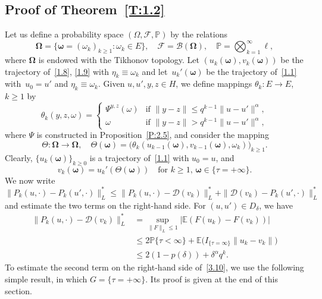 \documentclass[JEP,XML,SOM,Unicode,ThmDefs]{cedram}
\let\mathcal\mathscr
\theoremstyle{plain}
\numberwithin{equation}{section}
\newcommand{\IP}{{\mathbb P}}
\newcommand{\E}{{\mathbb E}}
\newcommand{\OOmega}{{\boldsymbol\Omega}}
\newcommand{\oomega}{{\boldsymbol\omega}}
\newcommand{\BB}{{\mathcal B}}
\newcommand{\DD}{{\mathcal D}}
\newcommand{\FF}{{\mathcal F}}
\begin{document}
\subsection{Proof of Theorem~\ref{T:1.2}}
\label{s3.2}
Let us define a probability space $(\Omega,\FF,\IP)$ by the relations\vspace*{-3pt}
\[
\OOmega=\{\oomega=(\omega_k)_{k\ge1}:\omega_k\in E\}, \quad
\FF=\BB(\OOmega),\quad \IP=\bigotimes_{k=1}^\infty\ell,
\]
where $\OOmega$ is endowed with the Tikhonov topology.
Let $(u_k(\oomega), v_k(\oomega))$ be the trajectory of~\eqref{1.8}, \eqref{1.9} with $\eta_k\equiv\omega_k$ and let~$u_k'(\oomega)$ be the trajectory of~\eqref{1.1} with~$u_0=u'$ and $\eta_k\equiv\omega_k$. Given $u,u',y,z\in H$, we define mappings $\theta_k:E\to E$, $k\ge1$ by\vspace*{-3pt}
\begin{equation} \label{3.08}
\theta_k(y,z,\omega)
=
\begin{cases}
\varPsi^{y,z}(\omega)
&\text{if } \|y-z\|
\le q^{k-1}\|u-u'\|^\alpha,\\[3pt]
\omega &\text{if } \|y-z\|
> q^{k-1}\|u-u'\|^\alpha,
\end{cases}
\end{equation}
where $\Psi$ is constructed in Proposition~\ref{P:2.5}, and consider the mapping
\[
\Theta:\OOmega\to\OOmega,\quad
\Theta(\oomega)
=\bigl(\theta_k(u_{k-1}(\oomega),v_{k-1}(\oomega),\omega_k)\bigr)_{k\ge1}.
\]
Clearly, $\{u_k(\oomega)\}_{k\ge0}$ is a trajectory of~\eqref{1.1} with $u_0=u$, and
\begin{equation} \label{3.09}
v_k(\oomega)=u_k'(\Theta(\oomega))\quad
\text{for $k\ge1$, $\oomega\in\{\tau=+\infty\}$}.
\end{equation}
We now write\vspace*{-3pt}
\begin{equation} \label{3.10}
\|P_k(u,\cdot)-P_k(u',\cdot)\|_L^*
\le \|P_k(u,\cdot)-\DD(v_k)\|_L^*+\|\DD(v_k)-P_k(u',\cdot)\|_L^*
\end{equation}
and estimate the two terms on the right-hand side. For $(u,u')\in D_\delta$, we have\vspace*{-3pt}
\begin{equation}\label{3.011}
\begin{aligned}
\|P_k(u,\cdot)-\DD(v_k)\|_L^*
&=\sup_{\|F\|_L\le1}\bigl|\E(F(u_k)-F(v_k))\bigr|\\
&\le2\IP\{\tau<\infty\}+\E\bigl(I_{\{\tau=\infty\}}\|u_k-v_k\|\bigr)\\
&\le 2(1-p(\delta))+\delta^\alpha q^{k}.
\end{aligned}
\end{equation}
To estimate the second term on the right-hand side of~\eqref{3.10}, we use the following simple result, in which $G=\{\tau=+\infty\}$. Its proof is given at the end of this section.
\end{document}
